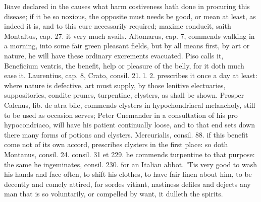 {\lettrine{I} have declared in the causes what harm costiveness hath done in
procuring this disease; if it be so noxious, the opposite must needs be
good, or mean at least, as indeed it is, and to this cure necessarily
required; maxime conducit, saith Montaltus, cap. 27. it very much
avails.  Altomarus, cap. 7, commends walking in a morning, into
some fair green pleasant fields, but by all means first, by art or
nature, he will have these ordinary excrements evacuated. Piso calls
it, Beneficium ventris, the benefit, help or pleasure of the belly, for
it doth much ease it. Laurentius, cap. 8, Crato, consil. 21. l. 2.
prescribes it once a day at least: where nature is defective, art must
supply, by those lenitive electuaries, suppositories, condite prunes,
turpentine, clysters, as shall be shown. Prosper Calenus, lib. de atra
bile, commends clysters in hypochondriacal melancholy, still to be used
as occasion serves;  Peter Cnemander in a consultation of his pro
hypocondriaco, will have his patient continually loose, and to that end
sets down there many forms of potions and clysters. Mercurialis,
consil. 88. if this benefit come not of its own accord, prescribes
clysters in the first place: so doth Montanus, consil. 24.
consil. 31 et 229. he commends turpentine to that purpose: the same he
ingeminates, consil. 230. for an Italian abbot. 'Tis very good to wash
his hands and face often, to shift his clothes, to have fair linen
about him, to be decently and comely attired, for sordes vitiant,
nastiness defiles and dejects any man that is so voluntarily, or
compelled by want, it dulleth the spirits.

}
